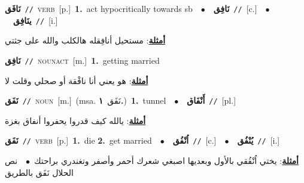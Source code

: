 \documentclass[10pt,a4paper,twoside]{article} %
\begin{document}
\begin{multicols}{2}
{\setlength\topsep{0pt}\textbf{\foreignlanguage{arabic}{نَافَق}}\ {\color{gray}\texttt{//}\color{black}}\ \textsc{verb}\ [p.]\ \textbf{1.}~act hypocritically towards sb\ \ $\bullet$\ \ \setlength\topsep{0pt}\textbf{\foreignlanguage{arabic}{نَافِق}}\ {\color{gray}\texttt{//}\color{black}}\ [c.]\ \ $\bullet$\ \ \setlength\topsep{0pt}\textbf{\foreignlanguage{arabic}{ينَافِق}}\ {\color{gray}\texttt{//}\color{black}}\ [i.]\  \begin{flushright}\color{gray}\foreignlanguage{arabic}{\textbf{\underline{\foreignlanguage{arabic}{أمثلة}}}: مستحيل أنافِقله هالكلب والله على جثتي}\end{flushright}\color{black}} \vspace{2mm}

{\setlength\topsep{0pt}\textbf{\foreignlanguage{arabic}{نَافِق}}\ {\color{gray}\texttt{//}\color{black}}\ \textsc{noun\textunderscore act}\ [m.]\ \textbf{1.}~getting married\  \begin{flushright}\color{gray}\foreignlanguage{arabic}{\textbf{\underline{\foreignlanguage{arabic}{أمثلة}}}: هو يعني أنا نافْقة أو صحلي وقلت لا}\end{flushright}\color{black}} \vspace{2mm}

{\setlength\topsep{0pt}\textbf{\foreignlanguage{arabic}{نَفَق}}\ {\color{gray}\texttt{//}\color{black}}\ \textsc{noun}\ [m.]\ \color{gray}(msa. \foreignlanguage{arabic}{نَفَق}~\foreignlanguage{arabic}{\textbf{١.}})\color{black}\ \textbf{1.}~tunnel\ \ $\bullet$\ \ \setlength\topsep{0pt}\textbf{\foreignlanguage{arabic}{أَنْفَاق}}\ {\color{gray}\texttt{//}\color{black}}\ [pl.]\  \begin{flushright}\color{gray}\foreignlanguage{arabic}{\textbf{\underline{\foreignlanguage{arabic}{أمثلة}}}: يالله كيف قدروا يحفروا أنفاق بغزة}\end{flushright}\color{black}} \vspace{2mm}

{\setlength\topsep{0pt}\textbf{\foreignlanguage{arabic}{نَفَق}}\ {\color{gray}\texttt{//}\color{black}}\ \textsc{verb}\ [p.]\ \textbf{1.}~die  \textbf{2.}~get married\ \ $\bullet$\ \ \setlength\topsep{0pt}\textbf{\foreignlanguage{arabic}{اُنْفُق}}\ {\color{gray}\texttt{//}\color{black}}\ [c.]\ \ $\bullet$\ \ \setlength\topsep{0pt}\textbf{\foreignlanguage{arabic}{يُنْفُق}}\ {\color{gray}\texttt{//}\color{black}}\ [i.]\  \begin{flushright}\color{gray}\foreignlanguage{arabic}{\textbf{\underline{\foreignlanguage{arabic}{أمثلة}}}: يختي اُنْفُقي بالأول وبعديها اصبغي شعرك أحمر وأصفر وتغندري براحتك\ $\bullet$\ \  نص الحلال نَفَق بالطريق}\end{flushright}\color{black}} \vspace{2mm}


\end{multicols}
\end{document}
